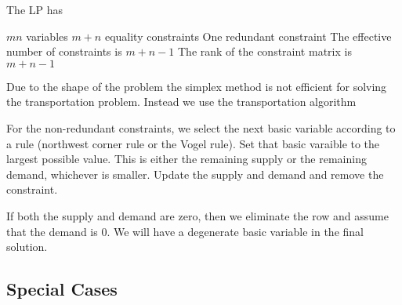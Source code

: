 \documentclass{report}
\begin{document}
The LP has

\begin{itemize}
	\ii $mn$ variables
	\ii $m+n$ equality constraints
	\ii One redundant constraint
	\ii The effective number of constraints is $m+n-1$
	\ii The rank of the constraint matrix is $m+n-1$
\end{itemize}

Due to the shape of the problem the simplex method is not efficient for solving the transportation problem. Instead we use the transportation algorithm

\begin{enumerate}
	\ii For the non-redundant constraints, we select the next basic variable according to a rule (northwest corner rule or the Vogel rule).
	\ii Set that basic varaible to the largest possible value. This is either the remaining supply or the remaining demand, whichever is smaller.
	\ii Update the supply and demand and remove the constraint.
\end{enumerate}

If both the supply and demand are zero, then we eliminate the row and assume that the demand is 0. We will have a degenerate basic variable in the final solution.



\subsection{Special Cases}
\end{document}
